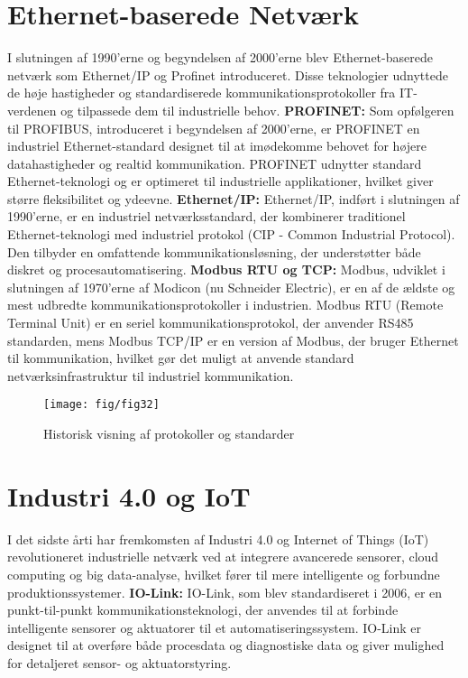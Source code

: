 \section{Ethernet-baserede Netværk}
I slutningen af 1990'erne og begyndelsen af 2000'erne blev Ethernet-baserede netværk som Ethernet/IP og Profinet introduceret. Disse teknologier udnyttede de høje hastigheder og standardiserede kommunikationsprotokoller fra IT-verdenen og tilpassede dem til industrielle behov.
\newline\newline\noindent
\textbf{PROFINET:} Som opfølgeren til PROFIBUS, introduceret i begyndelsen af 2000'erne, er PROFINET en industriel Ethernet-standard designet til at imødekomme behovet for højere datahastigheder og realtid kommunikation. PROFINET udnytter standard Ethernet-teknologi og er optimeret til industrielle applikationer, hvilket giver større fleksibilitet og ydeevne.
\newline\newline\noindent
\textbf{Ethernet/IP:} Ethernet/IP, indført i slutningen af 1990'erne, er en industriel netværksstandard, der kombinerer traditionel Ethernet-teknologi med industriel protokol (CIP - Common Industrial Protocol). Den tilbyder en omfattende kommunikationsløsning, der understøtter både diskret og procesautomatisering.
\newline\newline\noindent
\textbf{Modbus RTU og TCP:} Modbus, udviklet i slutningen af 1970'erne af Modicon (nu Schneider Electric), er en af de ældste og mest udbredte kommunikationsprotokoller i industrien. Modbus RTU (Remote Terminal Unit) er en seriel kommunikationsprotokol, der anvender RS485 standarden, mens Modbus TCP/IP er en version af Modbus, der bruger Ethernet til kommunikation, hvilket gør det muligt at anvende standard netværksinfrastruktur til industriel kommunikation.
\begin{figure}[!h]
	\centering
	\texttt{[image: fig/fig32]}
	\caption{Historisk visning af protokoller og standarder}
\end{figure}

\section{Industri 4.0 og IoT}
I det sidste årti har fremkomsten af Industri 4.0 og Internet of Things (IoT) revolutioneret industrielle netværk ved at integrere avancerede sensorer, cloud computing og big data-analyse, hvilket fører til mere intelligente og forbundne produktionssystemer.
\newline\newline\noindent
\textbf{IO-Link:} IO-Link, som blev standardiseret i 2006, er en punkt-til-punkt kommunikationsteknologi, der anvendes til at forbinde intelligente sensorer og aktuatorer til et automatiseringssystem. IO-Link er designet til at overføre både procesdata og diagnostiske data og giver mulighed for detaljeret sensor- og aktuatorstyring.
\clearpage